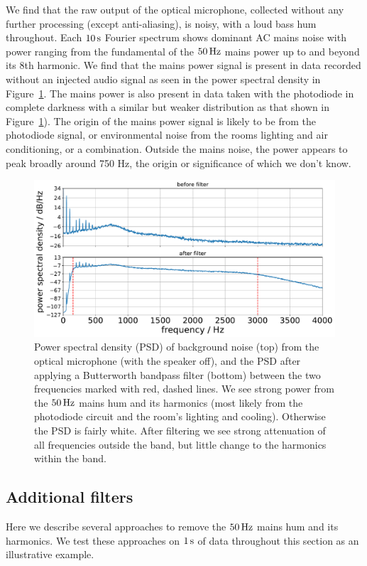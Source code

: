 \documentclass[paper-main.tex]{subfiles}
\begin{document}
We find that the raw output of the optical microphone, collected without any further processing (except anti-aliasing), is noisy, with a loud bass hum throughout.
Each $10\,{\rm s}$ Fourier spectrum shows dominant AC mains noise with power ranging from the fundamental of the $50\,{\rm Hz}$ mains power up to and beyond its $8$th harmonic. 
We find that the mains power signal is present in data recorded without an injected audio signal as seen in the power spectral density in Figure~\ref{fig:psd_noise}.
The mains power is also present in data taken with the photodiode in complete darkness with a similar but weaker distribution as that shown in Figure~\ref{fig:psd_noise}).
The origin of the mains power signal is likely to be from the photodiode signal, or environmental noise from the rooms lighting and air conditioning, or a combination. 
Outside the mains noise, the power appears to peak broadly around 750 Hz, the origin or significance of which we don't know. 

\begin{figure}
	\includegraphics[width=.49\textwidth]{figures/psd_butterworth_14_6.pdf}
	\caption{\label{fig:psd_noise}
Power spectral density (PSD) of background noise (top) from the optical microphone (with the speaker off), and the PSD after applying a Butterworth bandpass filter (bottom) between the two frequencies marked with red, dashed lines. 
We see strong power from the $50\,{\rm Hz}$ mains hum and its harmonics (most likely from the photodiode circuit and the room’s lighting and cooling). Otherwise the PSD is fairly white. 
After filtering we see strong attenuation of all frequencies outside the band, but little change to the harmonics within the band.
}
\end{figure}


\subsection{Additional filters}
\label{sec:simple_filters}

Here we describe several approaches to remove the $50\,{\rm Hz}$ mains hum and its harmonics. 
We test these approaches on $1\,{\rm s}$ of data throughout this section as an illustrative example. 
\end{document}
